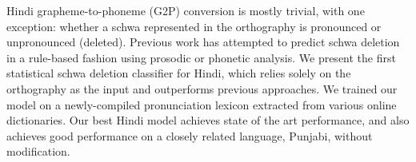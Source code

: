 Hindi grapheme-to-phoneme (G2P) conversion is mostly trivial, with one exception: whether a schwa represented in the orthography is pronounced or unpronounced (deleted). Previous work has attempted to predict schwa deletion in a rule-based fashion using prosodic or phonetic analysis. We present the first statistical schwa deletion classifier for Hindi, which relies solely on the orthography as the input and outperforms previous approaches. We trained our model on a newly-compiled pronunciation lexicon extracted from various online dictionaries. Our best Hindi model achieves state of the art performance, and also achieves good performance on a closely related language, Punjabi, without modification.
